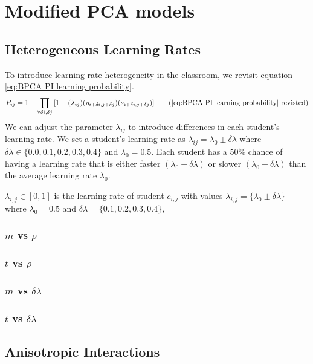 \chapter{Modified PCA models}

\section{Heterogeneous Learning Rates}
To introduce learning rate heterogeneity in the classroom, we revisit equation \ref{eq:BPCA PI learning probability}. 
\begin{equation*}
    P_{ij} = 1 - \prod_{\forall \delta i, \delta j}{\lbrack1-(\lambda_{ij})(\rho_{i+\delta i, j+\delta j})(s_{i+\delta i, j+\delta j})}\rbrack
    \tag{\ref{eq:BPCA PI learning probability} revisted}
\end{equation*}
We can adjust the parameter $\lambda_{ij}$ to introduce differences in each student's learning rate. We set a student's learning rate as $\lambda_{ij} = \lambda_0 \pm \delta\lambda$ where $\delta\lambda \in \lbrace 0.0,0.1, 0.2, 0.3, 0.4\rbrace$ and $\lambda_0 = 0.5$. Each student has a 50\% chance of having a learning rate that is either faster $(\lambda_0 + \delta\lambda)$ or slower $(\lambda_0 - \delta\lambda)$ than the average learning rate $\lambda_0$. 

$\lambda_{i,j} \in [0,1]$ is the learning rate of student $c_{i,j}$ with values $\lambda_{i,j} = \lbrace \lambda_0 \pm \delta \lambda \rbrace$ where $\lambda_0 = 0.5$ and $\delta \lambda = \lbrace 0.1, 0.2, 0.3, 0.4 \rbrace$, 

\subsection{$m$ vs $\rho$}\label{subsec:BPCAIH m vs rho}
\subsection{$t$ vs $\rho$}\label{subsec:BPCAIH t vs rho}
\subsection{$m$ vs $\delta\lambda$}\label{subsec:BPCAIH m vs dl}
\subsection{$t$ vs $\delta\lambda$}\label{subsec:BPCAIH t vs dl}

\section{Anisotropic Interactions}
